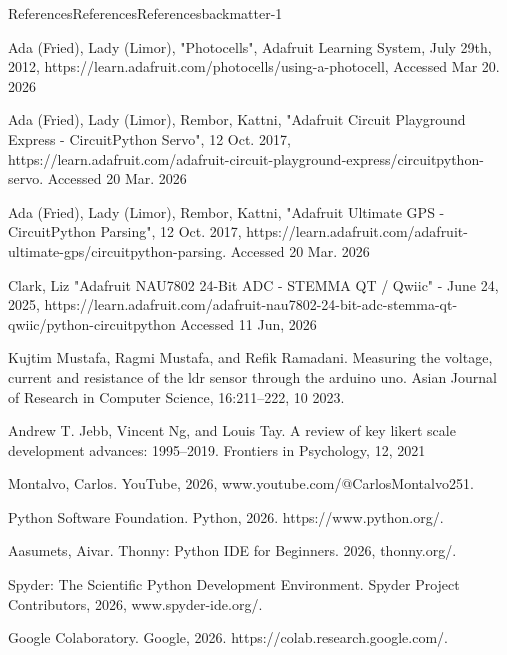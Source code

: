 \documentclass[oneside,10pt,]{book}
\numberwithin{equation}{section}
\begin{document}
\begin{references-chapter-numberless}{References}{References}{}{References}{}{}{backmatter-1}
\begin{referencelist}
\hypertarget{photocell-wiring}{}Ada (Fried), Lady (Limor), "Photocells", Adafruit Learning System, July 29th, 2012, https:\slash{}\slash{}learn.adafruit.com\slash{}photocells\slash{}using-a-photocell, Accessed Mar 20. 2026%

\hypertarget{servo-wiring}{}Ada (Fried), Lady (Limor), Rembor, Kattni, "Adafruit Circuit Playground Express - CircuitPython Servo", 12 Oct. 2017, https:\slash{}\slash{}learn.adafruit.com\slash{}adafruit-circuit-playground-express\slash{}circuitpython-servo. Accessed 20 Mar. 2026%

\hypertarget{gps-wiring}{}Ada (Fried), Lady (Limor), Rembor, Kattni, "Adafruit Ultimate GPS - CircuitPython Parsing", 12 Oct. 2017, https:\slash{}\slash{}learn.adafruit.com\slash{}adafruit-ultimate-gps\slash{}circuitpython-parsing. Accessed 20 Mar. 2026%

\hypertarget{load-cell-wiring}{}Clark, Liz "Adafruit NAU7802 24-Bit ADC - STEMMA QT \slash{} Qwiic" - June 24, 2025, https:\slash{}\slash{}learn.adafruit.com\slash{}adafruit-nau7802-24-bit-adc-stemma-qt-qwiic\slash{}python-circuitpython Accessed 11 Jun, 2026%

\hypertarget{b_photocell}{}Kujtim Mustafa, Ragmi Mustafa, and Refik Ramadani. Measuring the voltage, current and resistance of the ldr sensor through the arduino uno. Asian Journal of Research in Computer Science, 16:211–222, 10 2023.%

\hypertarget{likert}{}Andrew T. Jebb, Vincent Ng, and Louis Tay. A review of key likert scale development advances: 1995–2019. Frontiers in Psychology, 12, 2021%

\hypertarget{youtube}{}Montalvo, Carlos. YouTube, 2026, www.youtube.com\slash{}@CarlosMontalvo251.%

\hypertarget{python}{}Python Software Foundation. Python, 2026. https:\slash{}\slash{}www.python.org\slash{}.%

\hypertarget{thonny}{}Aasumets, Aivar. Thonny: Python IDE for Beginners. 2026, thonny.org\slash{}.%

\hypertarget{spyder}{}Spyder: The Scientific Python Development Environment. Spyder Project Contributors, 2026, www.spyder-ide.org\slash{}.%

\hypertarget{colab}{}Google Colaboratory. Google, 2026. https:\slash{}\slash{}colab.research.google.com\slash{}.%


\end{referencelist}
\end{references-chapter-numberless}
\end{document}
